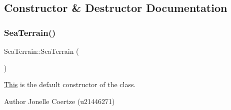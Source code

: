 \subsection{Constructor \& Destructor Documentation}
\mbox{\label{class_sea_terrain_a97f6efb8332d4cbc4f9a403eae6d6ac8}} 
\subsubsection{\texorpdfstring{SeaTerrain()}{SeaTerrain()}}
{\footnotesize\ttfamily Sea\+Terrain\+::\+Sea\+Terrain (\begin{DoxyParamCaption}{ }\end{DoxyParamCaption})}



\mbox{\hyperlink{class_this}{This}} is the default constructor of the class. 

\begin{DoxyAuthor}{Author}
Jonelle Coertze (u21446271) 
\end{DoxyAuthor}
